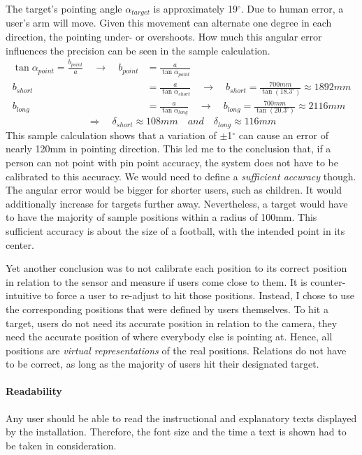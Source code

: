 The target's pointing angle $\alpha_{target}$ is approximately 19$^\circ$. Due to human error, a user's arm will move. Given this movement can alternate one degree in each direction, the pointing under- or overshoots. How much this angular error influences the precision can be seen in the sample calculation.
\begin{align*}
	\tan{\alpha_{point}} = \frac{b_{point}}{a} \quad \to \quad b_{point} &= \frac{a}{\tan{\alpha_{point}}}
	\\
	b_{short} &= \frac{a}{\tan{\alpha_{short}}} \quad \to \quad b_{short} = \frac{700mm}{\tan{(18.3^\circ)}} \approx 1892mm
	\\
	b_{long} &= \frac{a}{\tan{\alpha_{long}}} \quad \to \quad b_{long} = \frac{700mm}{\tan{(20.3^\circ)}} \approx 2116mm
\end{align*}
$$\Rightarrow \quad \delta_{short} \approx 108mm \quad and \quad \delta_{long} \approx 116mm$$
This sample calculation shows that a variation of $\pm$1$^\circ$ can cause an error of nearly 120mm in pointing direction. This led me to the conclusion that, if a person can not point with pin point accuracy, the system does not have to be calibrated to this accuracy. We would need to define a \textit{sufficient accuracy} though. The angular error would be bigger for shorter users, such as children. It would additionally increase for targets further away. Nevertheless, a target would have to have the majority of sample positions within a radius of 100mm. This sufficient accuracy is about the size of a football, with the intended point in its center.

Yet another conclusion was to not calibrate each position to its correct position in relation to the sensor and measure if users come close to them. It is counter-intuitive to force a user to re-adjust to hit those positions. Instead, I chose to use the corresponding positions that were defined by users themselves. To hit a target, users do not need its accurate position in relation to the camera, they need the accurate position of where everybody else is pointing at. Hence, all positions are \textit{virtual representations} of the real positions. Relations do not have to be correct, as long as the majority of users hit their designated target.


\paragraph{Readability} Any user should be able to read the instructional and explanatory texts displayed by the installation. Therefore, the font size and the time a text is shown had to be taken in consideration.

